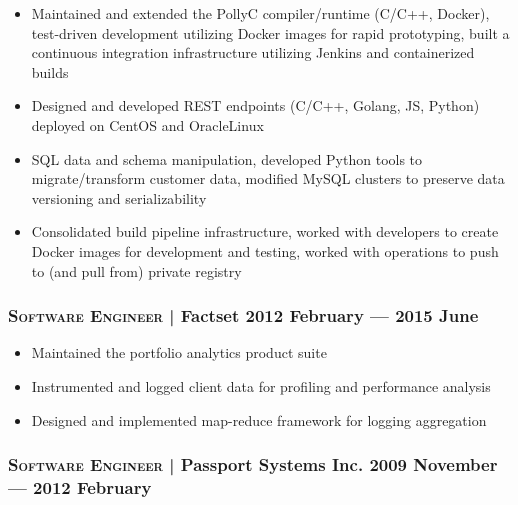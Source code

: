 \documentclass[letterpaper,10pt]{article}
\begin{document}
\begin{itemize}

\item
  Maintained and extended the PollyC compiler/runtime (C/C++, Docker),
  test-driven development utilizing Docker images for rapid prototyping, built
  a continuous integration infrastructure utilizing Jenkins and containerized
  builds
\item
  Designed and developed REST endpoints (C/C++, Golang, JS, Python) deployed on
  CentOS and OracleLinux
\item
  SQL data and schema manipulation, developed Python tools to migrate/transform
  customer data, modified MySQL clusters to preserve data versioning and
  serializability
\item
  Consolidated build pipeline infrastructure, worked with developers to create
  Docker images for development and testing, worked with operations to push to
  (and pull from) private registry

\end{itemize}



\subsubsection*{\textsc{Software Engineer} | Factset \hfill 2012 February --- 2015 June}

\begin{itemize}

\item
  Maintained the portfolio analytics product suite
\item
  Instrumented and logged client data for profiling and performance analysis
\item
  Designed and implemented map-reduce framework for logging aggregation

\end{itemize}


\subsubsection*{\textsc{Software Engineer} | Passport Systems Inc. \hfill 2009 November --- 2012 February}
\end{document}
